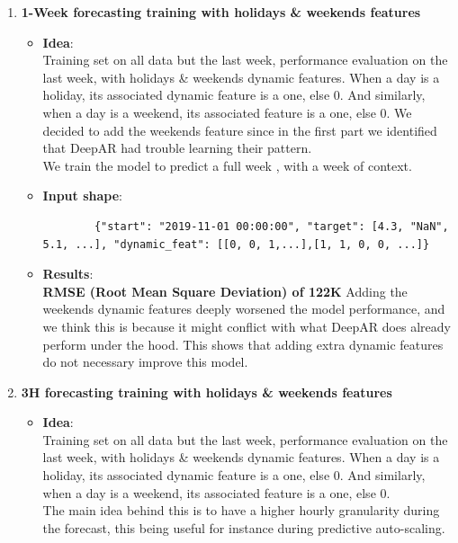 \begin{enumerate}
    \item \textbf{1-Week forecasting training with holidays \& weekends features}
    \begin{itemize}
        \item[] \textbf{Idea}:\\
        Training set on all data but the last week, performance evaluation on the last week, with holidays \& weekends dynamic features. When a day is a holiday, its associated dynamic feature is a one, else 0. And similarly, when a day is a weekend, its associated feature is a one, else 0. We decided to add the weekends feature since in the first part we identified that DeepAR had trouble learning their pattern.\\
        We train the model to predict a full week , with a week of context.

        \item[] \textbf{Input shape}:\\
        \begin{lstlisting}
        {"start": "2019-11-01 00:00:00", "target": [4.3, "NaN", 5.1, ...], "dynamic_feat": [[0, 0, 1,...],[1, 1, 0, 0, ...]}
        \end{lstlisting}

        \item[] \textbf{Results}:\\
        \textbf{RMSE (Root Mean Square Deviation) of 122K }
        Adding the weekends dynamic features deeply worsened the model performance, and we think this is because it might conflict with what DeepAR does already perform under the hood. This shows that adding extra dynamic features do not necessary improve this model.
    \end{itemize}
    

    \item \textbf{3H forecasting training with holidays \& weekends features}
    \begin{itemize}
        \item[] \textbf{Idea}:\\
        Training set on all data but the last week, performance evaluation on the last week, with holidays \& weekends dynamic features. When a day is a holiday, its associated dynamic feature is a one, else 0. And similarly, when a day is a weekend, its associated feature is a one, else 0.  \\
        The main idea behind this is to have a higher hourly granularity during the forecast, this being useful for instance during predictive auto-scaling.
        

\end{itemize}
\end{enumerate}
